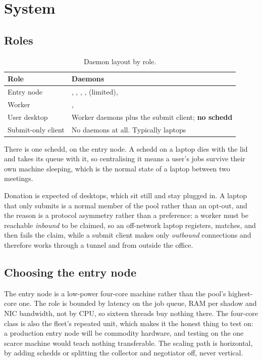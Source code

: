 \section{System}
\label{sec:system}

\subsection{Roles}

\begin{table}[H]
\centering
\begin{tabularx}{\textwidth}{L{0.26\textwidth} Y}
\toprule
\textbf{Role} & \textbf{Daemons} \\
\midrule
Entry node & , , , ,  (limited),  \\
Worker & ,  \\
User desktop & Worker daemons plus the submit client; \textbf{no schedd} \\
Submit-only client & No daemons at all. Typically laptops \\
\bottomrule
\end{tabularx}
\caption{Daemon layout by role.}
\end{table}

There is one schedd, on the entry node. A schedd on a laptop dies with the lid
and takes its queue with it, so centralising it means a user's jobs survive
their own machine sleeping, which is the normal state of a laptop between two
meetings.

Donation is expected of desktops, which sit still and stay plugged in. A laptop
that only submits is a normal member of the pool rather than an opt-out, and the
reason is a protocol asymmetry rather than a preference: a worker must be
reachable \emph{inbound} to be claimed, so an off-network laptop registers,
matches, and then fails the claim, while a submit client makes only
\emph{outbound} connections and therefore works through a tunnel and from
outside the office.

\subsection{Choosing the entry node}

The entry node is a low-power four-core machine rather than the pool's
highest-core one. The role is bounded by  latency on the job queue,
RAM per shadow and NIC bandwidth, not by CPU, so sixteen threads buy nothing
there. The four-core class is also the fleet's repeated unit, which makes it the
honest thing to test on: a production entry node will be commodity hardware, and
testing on the one scarce machine would teach nothing transferable. The scaling
path is horizontal, by adding schedds or splitting the collector and negotiator
off, never vertical.

